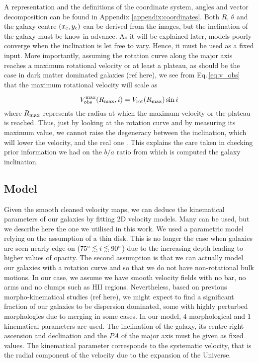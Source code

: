 A representation and the definitions of the coordinate system, angles and vector decomposition can be found in Appendix \ref{appendix:coordinates}. Both $R$, $\theta$ and the galaxy centre $(x_{\rm{c}} , y_{\rm{c}})$ can be derived from the images, but the inclination of the galaxy must be know in advance. As it will be explained later, models poorly converge when the inclination is let free to vary. Hence, it must be used as a fixed input. More importantly, assuming the rotation curve along the major axis reaches a maximum rotational velocity or at least a plateau, as should be the case in dark matter dominated galaxies (ref here), we see from Eq.\,\ref{eq:v_obs} that the maximum rotational velocity will scale as

\begin{equation}
	V_{\rm{obs}}^{\rm{max}} (R_{\rm{max}}, i) = V_{\rm{rot}} (R_{\rm{max}}) \sin i
\end{equation}
where $R_{\rm{max}}$ represents the radius at which the maximum velocity or the plateau is reached. Thus, just by looking at the rotation curve and by measuring its maximum value, we cannot raise the degeneracy between the inclination, which will lower the velocity, and the real one . This explains the care taken in checking prior information we had on the $b/a$ ratio from which is computed the galaxy inclination.


\subsection{Model}
\label{subsec:model}

Given the smooth cleaned velocity maps, we can deduce the kinematical parameters of our galaxies by fitting 2D velocity models. Many can be used, but we describe here the one we utilised in this work. 
We used a parametric model relying on the assumption of a thin disk. This is no longer the case when galaxies are seen nearly edge-on ($75 \degree \lesssim i \lesssim 90 \degree$) due to the increasing depth leading to higher values of opacity. The second assumption is that we can actually model our galaxies with a rotation curve and so that we do not have non-rotational bulk motions. In our case, we assume we have smooth velocity fields with no bar, no arms and no clumps such as HII regions. Nevertheless, based on previous morpho-kinematical studies (ref here), we might expect to find a significant fraction of our galaxies to be dispersion dominated, some with highly perturbed morphologies due to merging in some cases.
In our model, $4$ morphological and $1$ kinematical parameters are used. The inclination of the galaxy, its centre right ascension and declination and the $PA$ of the major axis must be given as fixed values. The kinematical parameter corresponds to the systematic velocity, that is the radial component of the velocity due to the expansion of the Universe.

